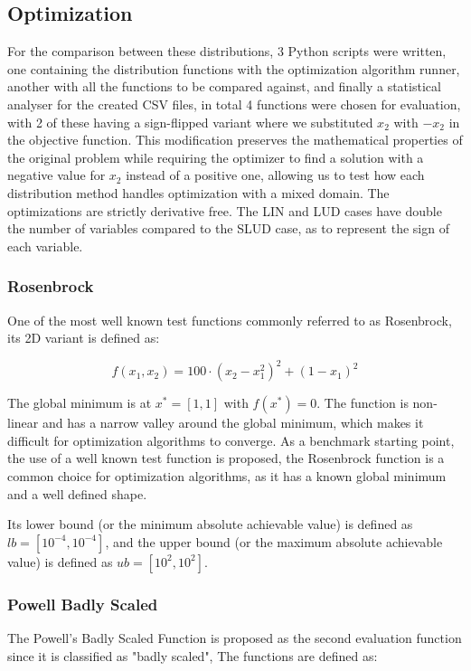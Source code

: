 \documentclass[10pt,fleqn,a4paper,twoside]{article}
\begin{document}
\subsection{Optimization}
For the comparison between these distributions, 3 Python scripts were written, one containing the distribution functions with the optimization algorithm runner, another with all the functions to be 
compared against, and finally a statistical analyser for the created CSV files, in total 4 functions were chosen for evaluation, with 2 of these having a sign-flipped variant where we substituted $x_2$ with $-x_2$ in the objective function. This modification preserves the mathematical properties of the original problem while requiring the optimizer to find a solution with a negative value for $x_2$ instead of a positive one, 
allowing us to test how each distribution method handles optimization with a mixed domain. The optimizations are strictly derivative free. The LIN and LUD cases have double the number of variables compared to the SLUD case, as to
represent the sign of each variable.

\subsubsection{Rosenbrock}
One of the most well known test functions commonly referred to as Rosenbrock, its 2D variant is defined as:

\begin{equation}
    f(x_1, x_2) = 100 \cdot (x_2 - x_1^2)^2 + (1 - x_1)^2
    \label{Eq:rosenbrock}
\end{equation}

The global minimum is at $x^* = [1, 1]$ with $f(x^*) = 0$. The function is non-linear and has a narrow valley around the global minimum, which makes it difficult for optimization algorithms to converge.
As a benchmark starting point, the use of a well known test function is proposed, the Rosenbrock function is a common choice for optimization algorithms, as it has a known global minimum and a well defined shape.

Its lower bound (or the minimum absolute achievable value) is defined as $lb = [10^{-4}, 10^{-4}]$, and the upper bound (or the maximum absolute achievable value) is defined as $ub = [10^{2}, 10^{2}]$.



\subsubsection{Powell Badly Scaled}
The Powell's Badly Scaled Function is proposed as the second evaluation function since it is classified as "badly scaled", The functions are defined as:
\end{document}
